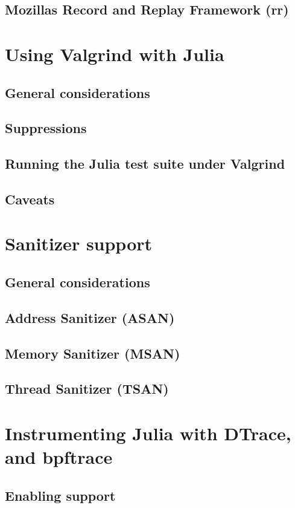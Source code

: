     \subsection{Mozilla{\textquotesingle}s Record and Replay Framework (rr)}
    \section{Using Valgrind with Julia}
    \subsection{General considerations}
    \subsection{Suppressions}
    \subsection{Running the Julia test suite under Valgrind}
    \subsection{Caveats}
    \section{Sanitizer support}
    \subsection{General considerations}
    \subsection{Address Sanitizer (ASAN)}
    \subsection{Memory Sanitizer (MSAN)}
    \subsection{Thread Sanitizer (TSAN)}
    \section{Instrumenting Julia with DTrace, and bpftrace}
    \subsection{Enabling support}
